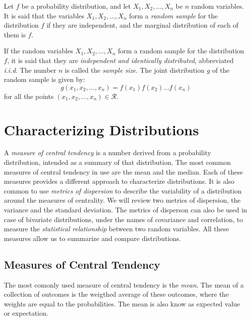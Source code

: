 \begin{definition}
Let $f$ be a probability distribution, and let $X_1, X_2, \ldots, X_n$ be $n$ random variables. It is said that the variables $X_1, X_2, \ldots, X_n$ form a \emph{random sample} for the distribution $f$ if they are independent, and the marginal distribution of each of them is $f$. 
\end{definition}

If the random variables $X_1, X_2, \ldots, X_n$ form a random sample for the distribution $f$, it is said that they are \emph{independent and identically distributed}, abbreviated \emph{i.i.d}. The number $n$ is called the \emph{sample size}. The joint distribution $g$ of the random sample is given by:
\[
g \left( x_1, x_2, \ldots, x_n \right) = f \left( x_1 \right) f \left( x_2 \right) \ldots f \left( x_n \right)
\]
for all the points $\left( x_1, x_2, \ldots, x_n \right) \in \mathcal{R}$.

%
%

\section{Characterizing Distributions}
\label{sec:probability_expectation}

A \emph{measure of central tendency} is a number derived from a probability distribution, intended as a summary of that distribution. The most common measures of central tendency in use are the mean and the median. Each of these measures provides a different approach to characterize distributions. It is also common to use \emph{metrics of dispersion} to describe the variability of a distribution around the measures of centrality. We will review two metrics of dispersion, the variance and the standard deviation. The metrics of disperson can also be used in case of bivariate distributions, under the names of covariance and correlation, to measure the \emph{statistical relationship} between two random variables. All these measures allow us to summarize and compare distributions.


\subsection{Measures of Central Tendency}

The most comonly used measure of central tendency is the \emph{mean}. The mean of a collection of outcomes is the weigthed average of these outcomes, where the weights are equal to the probabilities. The mean is also know as expected value or expectation.

